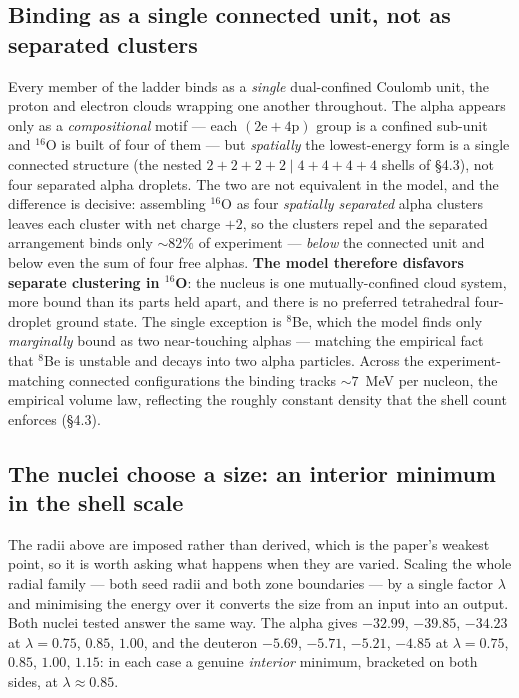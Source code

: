 \documentclass[11pt]{article}
\begin{document}
\subsection{Binding as a single connected unit, not as separated clusters}

Every member of the ladder binds as a \emph{single} dual-confined Coulomb unit, the proton and
electron clouds wrapping one another throughout. The alpha appears only as a \emph{compositional}
motif --- each $(\mathrm{2e}+\mathrm{4p})$ group is a confined sub-unit and $^{16}$O is built of
four of them --- but \emph{spatially} the lowest-energy form is a single connected structure
(the nested $2{+}2{+}2{+}2\mid 4{+}4{+}4{+}4$ shells of \S4.3), not four separated alpha
droplets. The two are not equivalent in the model, and the difference is decisive: assembling
$^{16}$O as four \emph{spatially separated} alpha clusters leaves each cluster with net charge
$+2$, so the clusters repel and the separated arrangement binds only ${\sim}82\%$ of experiment
--- \emph{below} the connected unit and below even the sum of four free alphas. \textbf{The model
therefore disfavors separate clustering in $^{16}$O}: the nucleus is one mutually-confined cloud
system, more bound than its parts held apart, and there is no preferred tetrahedral four-droplet
ground state. The single exception is $^8$Be, which the model finds only \emph{marginally} bound
as two near-touching alphas --- matching the empirical fact that $^8$Be is unstable and decays
into two alpha particles. Across the experiment-matching connected configurations the binding
tracks ${\sim}7$~MeV per nucleon, the empirical volume law, reflecting the roughly constant
density that the shell count enforces (\S4.3).

\subsection{The nuclei choose a size: an interior minimum in the shell scale}

The radii above are imposed rather than derived, which is the paper's weakest point, so it is worth
asking what happens when they are varied. Scaling the whole radial family --- both seed radii and
both zone boundaries --- by a single factor $\lambda$ and minimising the energy over it converts the
size from an input into an output. Both nuclei tested answer the same way. The alpha gives
$-32.99$, $-39.85$, $-34.23$ at $\lambda=0.75$, $0.85$, $1.00$, and the deuteron $-5.69$, $-5.71$,
$-5.21$, $-4.85$ at $\lambda=0.75$, $0.85$, $1.00$, $1.15$: in each case a genuine \emph{interior}
minimum, bracketed on both sides, at $\lambda\approx0.85$.
\end{document}
